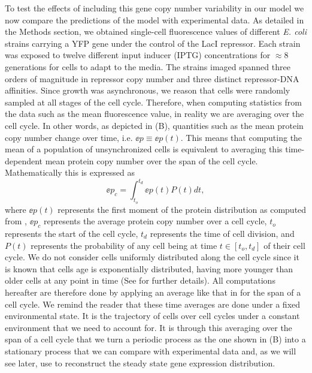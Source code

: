 To test the effects of including this gene copy number variability in our model
we now compare the predictions of the model with experimental data. As detailed
in the Methods section, we obtained single-cell fluorescence values of different
{\it E. coli} strains carrying a YFP gene under the control of the LacI
repressor. Each strain was exposed to twelve different input inducer (IPTG)
concentrations for $\approx 8$ generations for cells to adapt to the media. The
strains imaged spanned three orders of magnitude in repressor copy number and
three distinct repressor-DNA affinities. Since growth was asynchronous, we
reason that cells were randomly sampled at all stages of the cell cycle.
Therefore, when computing statistics from the data such as the mean fluorescence
value, in reality we are averaging over the cell cycle. In other words, as
depicted in (B), quantities such as the mean protein copy
number change over time, i.e. $\ee{p} \equiv \ee{p(t)}$. This means that
computing the mean of a population of unsynchronized cells is equivalent to
averaging this time-dependent mean protein copy number over the span of the cell
cycle. Mathematically this is expressed as
\begin{equation}
	\ee{p}_c = \int_{t_o}^{t_d} \ee{p(t)} P(t) dt,
	\label{eq_time_avg}
\end{equation}
where $\ee{p(t)}$ represents the first moment of the protein distribution as
computed from , $\ee{p}_c$ represents the average protein
copy number over a cell cycle, $t_o$ represents the start of the cell cycle,
$t_d$ represents the time of cell division, and $P(t)$ represents the
probability of any cell being at time $t \in [t_o, t_d]$ of their cell cycle.
We do not consider cells uniformly distributed along the cell cycle since it is
known that cells age is exponentially distributed, having more younger than
older cells at any point in time \cite{Powell1956} (See
 for further details). All computations hereafter are
therefore done by applying an average like that in  for the
span of a cell cycle. We remind the reader that these time averages are done
under a fixed environmental state. It is the trajectory of cells over cell
cycles under a constant environment that we need to account for. It is through
this averaging over the span of a cell cycle that we turn a periodic process as
the one shown in (B) into a stationary process that we can
compare with experimental data and, as we will see later, use to reconstruct the
steady state gene expression distribution.

